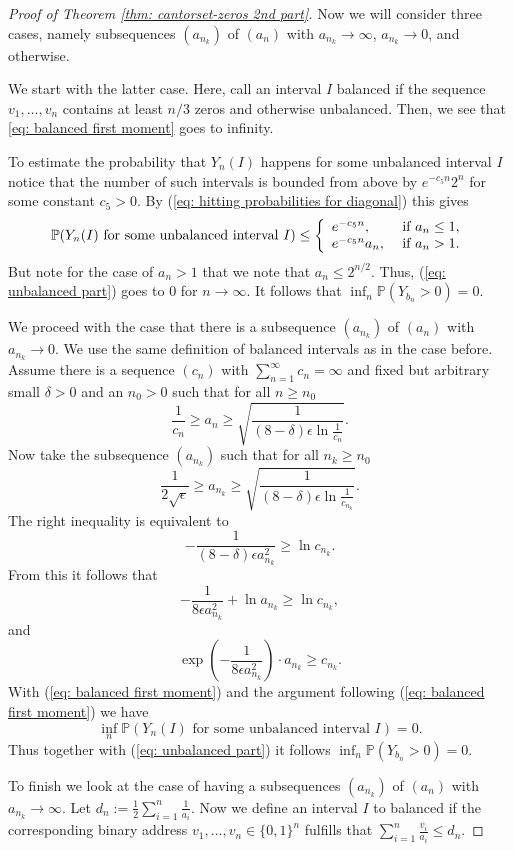 \documentclass[11pt,reqno]{amsart}
\theoremstyle{plain}
\theoremstyle{definition}
\theoremstyle{remark}
\begin{document}
\begin{proof}[Proof of Theorem \ref{thm: cantorset-zeros 2nd part}]
Now we will consider three cases, namely subsequences $(a_{n_k})$ of $(a_n)$ with $a_{n_k} \to \infty$, $a_{n_k} \to 0$, and otherwise.

We start with the latter case. Here, call 
 an interval $I$ { balanced} if the sequence $v_1, \dots, v_n$ contains at least $n/3$ zeros and otherwise unbalanced. Then, we see that \eqref{eq: balanced first moment} goes to infinity.    

To estimate the probability that $Y_n(I)$ happens for some unbalanced interval $I$ notice that the number of such intervals is bounded from above by $e^{-c_5 n}2^n$ for some constant $c_5>0$. By (\ref{eq: hitting probabilities for diagonal}) this gives
\begin{equation}\label{eq: unbalanced part}
\mathbb{P}(Y_n(I) \text{ for some unbalanced interval } I) \leq   \left\{\begin{array}{l l} e^{-c_5n},& \text{ if }a_n \leq 1, \\ e^{-c_5n} a_n,& \text{ if } a_n > 1. \end{array}\right.
\end{equation}
But note for the case of $a_n > 1$ that we note that $a_n \leq 2^{n/2}$. Thus, (\ref{eq: unbalanced part}) goes to 0 for $n \rightarrow \infty$. It follows that $\inf_n\mathbb{P}(Y_{b_n}>0)=0$.

We proceed with the case that there is a subsequence $(a_{n_k})$ of $(a_n)$ with $a_{n_k} \to 0$. We use the same definition of balanced intervals as in the case before.
Assume there is a sequence $(c_n)$ with $\sum_{n=1}^{\infty} c_n = \infty$ and fixed but arbitrary small $\delta > 0$  and an $n_0>0$ such that for all $n \geq n_0$
\[ \frac{1}{c_n}\geq a_n \geq \sqrt{\frac{1}{(8-\delta)\epsilon\ln{\frac{1}{c_n}}}}. \]
Now take the subsequence $(a_{n_k})$ such that for all $n_k \geq n_0$
\[ \frac{1}{2\sqrt{\epsilon}}\geq a_{n_k} \geq \sqrt{\frac{1}{(8-\delta)\epsilon\ln{\frac{1}{c_{n_k}}}}}. \]
The right inequality is equivalent to
\[ -\frac{1}{(8-\delta)\epsilon a_{n_k}^2}  \geq \ln{c_{n_k}}. \]
From this it follows that
\[ -\frac{1}{8\epsilon a_{n_k}^2} + \ln{a_{n_k}}  \geq \ln{c_{n_k}}, \]
and
\[ \exp{(-\frac{1}{8\epsilon a_{n_k}^2})} \cdot {a_{n_k}}  \geq {c_{n_k}}. \]
With (\ref{eq: balanced first moment}) and the argument following (\ref{eq: balanced first moment}) we have $$\inf_n\mathbb{P}(Y_n(I) \text{ for some unbalanced interval } I)=0.$$
Thus together with (\ref{eq: unbalanced part}) it follows $\inf_n\mathbb{P}(Y_{b_n}>0)=0$.

To finish we look at the case of having a subsequences $(a_{n_k})$ of $(a_n)$ with $a_{n_k} \to \infty$. Let $d_n := \frac 1 2 \sum_{i=1}^{n} \frac 1 {a_i}$. Now we define an interval $I$ to balanced if the corresponding binary address $v_1, \dots, v_n \in\{0,1\}^n$ fulfills that $\sum_{i=1}^{n} \frac {v_i} {a_i} \leq d_n$.


\end{proof}
\end{document}
